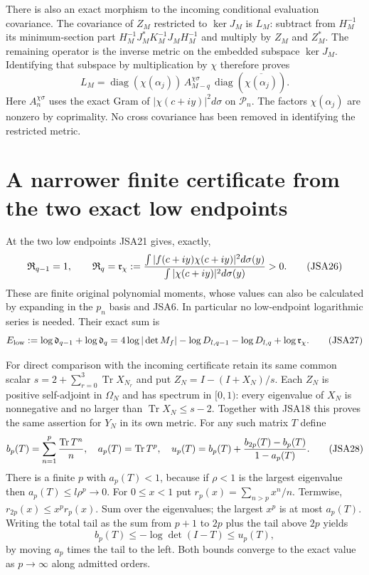 \documentclass[11pt,a4paper]{article}
\newcommand{\Pp}{\mathcal P}
\newcommand{\Tr}{\operatorname{Tr}}
\newcommand{\diag}{\operatorname{diag}}
\begin{document}
There is also an exact morphism to the incoming conditional
evaluation covariance. The covariance of $Z_M$ restricted to
$\ker J_M$ is $L_M$: subtract from $H_M^{-1}$ its minimum-section
part $H_M^{-1}J_M^*K_M^{-1}J_MH_M^{-1}$ and multiply by $Z_M$
and $Z_M^*$. The remaining operator is the inverse metric on
the embedded subspace $\ker J_M$. Identifying that subspace by
multiplication by $\chi$ therefore proves
\[
 L_M=\diag(\chi(\alpha_j))\,
       A_{M-q}^{\chi\sigma}\,
       \diag(\overline{\chi(\alpha_j)}).
\tag{JSA25}
\]
Here $A_n^{\chi\sigma}$ uses the exact Gram of
$|\chi(c+iy)|^2d\sigma$ on $\Pp_n$. The factors $\chi(\alpha_j)$
are nonzero by coprimality. No cross covariance has been removed
in identifying the restricted metric.

\section{A narrower finite certificate from the two exact low endpoints}

At the two low endpoints JSA21 gives, exactly,
\[
 \mathfrak R_{q-1}=1,\qquad
 \mathfrak R_q=\mathfrak r_\chi:={
    \int |f(c+iy)\chi(c+iy)|^2d\sigma(y)\over
    \int |\chi(c+iy)|^2d\sigma(y)}>0.
\tag{JSA26}
\]
These are finite original polynomial moments, whose values can
also be calculated by expanding in the $p_n$ basis and JSA6.
In particular no low-endpoint logarithmic series is needed.
Their exact sum is
\[
 E_{\rm low}:=\log\mathfrak d_{q-1}+\log\mathfrak d_q
  =4\log|\det M_f|-\log D_{l,q-1}-\log D_{l,q}
                        +\log\mathfrak r_\chi.
\tag{JSA27}
\]

For direct comparison with the incoming certificate retain its
same common scalar
$s=2+\sum_{r=0}^3\Tr X_{N_r}$ and put
$Z_N=I-(I+X_N)/s$. Each $Z_N$ is positive self-adjoint in
$\Omega_N$ and has spectrum in $[0,1)$: every eigenvalue of
$X_N$ is nonnegative and no larger than $\Tr X_N\leq s-2$.
Together with JSA18 this proves the same assertion for $Y_N$
in its own metric. For any such matrix $T$ define
\[
 b_p(T)=\sum_{n=1}^p{\Tr T^n\over n},\quad
 a_p(T)=\Tr T^p,\quad
 u_p(T)=b_p(T)+{b_{2p}(T)-b_p(T)\over1-a_p(T)}.
\tag{JSA28}
\]
There is a finite $p$ with $a_p(T)<1$, because if $\rho<1$ is
the largest eigenvalue then $a_p(T)\leq l\rho^p\to0$.
For $0\leq x<1$ put $r_p(x)=\sum_{n>p}x^n/n$. Termwise,
$r_{2p}(x)\leq x^p r_p(x)$. Sum over the eigenvalues; the
largest $x^p$ is at most $a_p(T)$. Writing the total tail as
the sum from $p+1$ to $2p$ plus the tail above $2p$ yields
\[
 b_p(T)\leq-\log\det(I-T)\leq u_p(T),
\tag{JSA29}
\]
by moving $a_p$ times the tail to the left. Both bounds converge
to the exact value as $p\to\infty$ along admitted orders.
\end{document}
